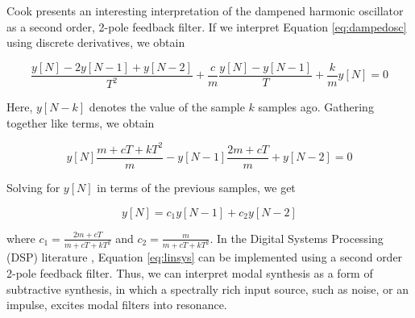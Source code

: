 Cook presents an interesting interpretation of the dampened harmonic oscillator as a second order,
2-pole feedback filter. If we interpret Equation \ref{eq:dampedosc} using discrete derivatives, we obtain 

\begin{equation}
\frac{y[N] - 2y[N-1] + y[N-2]}{T^2} + \frac{c}{m} \frac{y[N] - y[N-1]}{T} + \frac{k}{m} y[N] = 0
\end{equation}

Here, $y[N - k]$ denotes the value of the sample $k$ samples ago. Gathering together like terms, we obtain

\begin{equation}
y[N] \frac{m + cT + kT^2}{m} - y[N-1] \frac{2m + cT}{m} + y[N-2] = 0
\end{equation}

Solving for $y[N]$ in terms of the previous samples, we get

\begin{equation}
\label{eq:linsys}
y[N] = c_1 y[N-1] + c_2 y[N-2]
\end{equation}

where $c_1 = \frac{2m + cT}{m + cT + kT^2}$ and $c_2 = \frac{m}{m + cT + kT^2}$. In the Digital
Systems Processing (DSP) literature \cite{smith1997scientist}, Equation \ref{eq:linsys} can be implemented using a second order 2-pole feedback filter. 
Thus, we can interpret modal synthesis as a form of subtractive synthesis, in which a spectrally rich input source, such as
noise, or an impulse, excites modal filters into resonance.

